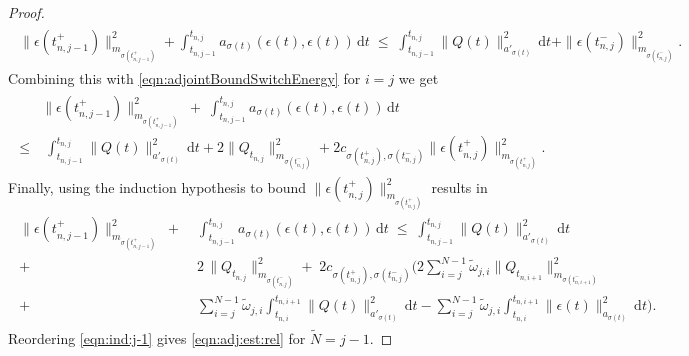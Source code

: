 \documentclass[reqno]{amsart}
\newcommand{\dt}{\,\mathrm{d}t}
\newcommand{\switch}{\sigma}
\newcommand{\nrSwitches}{N}
\newcommand{\addErr}{\epsilon}
\newcommand{\adResidual}{Q}
\begin{document}
\begin{proof}
    \begin{align*}
    \begin{aligned}
        \|\epsilon(t_{n,j-1}^+)\|^2_{m_{\switch(t_{n,j-1}^+)}}+ \int_{t_{n,j-1}}^{t_{n,j}}a_{\switch(t)}(\epsilon(t),\epsilon(t))\dt
		\;\leq\; \int_{t_{n,j-1}}^{t_{n,j}} \|\adResidual(t) \|^2_{{a'_{\switch(t)}}}\dt+\|\epsilon(t_{n,j}^-)\|^2_{m_{\switch(t^-_{n,j})}}.
  \end{aligned}
    \end{align*}
    Combining this with \eqref{eqn:adjointBoundSwitchEnergy} for $i=j$ we get
    \begin{align}\nonumber
    \begin{aligned}
       & \|\epsilon(t_{n,j-1}^+)\|^2_{m_{\switch(t_{n,j-1}^+)}}\;+\; \int_{t_{n,j-1}}^{t_{n,j}}a_{\switch(t)}(\epsilon(t),\epsilon(t))\dt\\ \nonumber
        \leq&\; \int_{t_{n,j-1}}^{t_{n,j}} \|\adResidual(t) \|^2_{{{a'_{{\switch(t)}}}}}\dt+2\|\adResidual_{t_{n,j}}\|^2_{m_{\switch(t^{-}_{n,j})}} +2{c_{\switch(t^+_{n,j}),\switch(t^-_{n,j})}}   \|\epsilon(t_{n,j}^+)\|^2_{m_{\switch(t^+_{n,j})}}.
    \end{aligned}
    \end{align}
    Finally, using the induction hypothesis to bound $\| \epsilon({t^+_{n,j}})\|^2_{m_{\switch(t^+_{n,j})}}$ results in
    \begin{align}\label{eqn:ind:j-1}
    \begin{aligned}
        \|\epsilon(t_{n,j-1}^+)\|^2_{m_{\switch(t_{n,j-1}^+)}}\;+&\; \int_{t_{n,j-1}}^{t_{n,j}}a_{\switch(t)}(\epsilon(t),\epsilon(t))\dt\;
		\leq\;  \int_{t_{n,j-1}}^{t_{n,j}} \|\adResidual(t) \|^2_{{{a'_{{\switch(t)}}}}}\dt\\
  +&\;2\,\|\adResidual_{t_{n,j}}\|^2_{m_{\switch(t^{-}_{n,j})}} 
  +\;2{c_{\switch(t^+_{n,j}),\switch(t^-_{n,j})}}\bigg(
    2\sum\limits_{i=j}^{N-1}\tilde \omega_{j,i} \|\adResidual_{t_{n,i+1}}\|_{m_{\switch(t^-_{n,i+1})}}^2 \\
    +&\; \sum\limits_{i=j}^{N-1}\tilde \omega_{j,i}  \int_{t_{n,i}}^{t_{n,i+1}}\|\adResidual(t)\|_{{{a'_{{\switch(t)}}}}}^2 \dt
    - \sum\limits_{i=j}^{N-1}\tilde  \omega_{j,i} \int_{t_{n,i}}^{t_{n,i+1}}\|\addErr(t)\|_{a_{\switch(t)}}^2 \dt\bigg).
    \end{aligned}
    \end{align}
    Reordering \eqref{eqn:ind:j-1} gives \eqref{eqn:adj:est:rel} for $\tilde \nrSwitches=j-1$. 
\end{proof}
%
\end{document}
